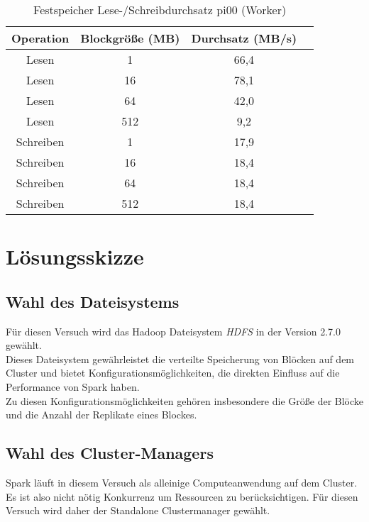 \begin{table}[ht]
	\centering %
	\begin{tabular}{c c c c} %
	\hline\hline %
	Operation & Blockgröße (MB) & Durchsatz (MB/s) \\ [0.5ex] %
	\hline %
	Lesen & 1 & 66,4 \\ 
	Lesen & 16 & 78,1 \\
	Lesen & 64 & 42,0 \\
	Lesen & 512 & 9,2 \\
	Schreiben & 1 & 17,9 \\ 
	Schreiben & 16 & 18,4 \\
	Schreiben & 64 & 18,4 \\
	Schreiben & 512 & 18,4 \\[1ex] 
	\hline %
	\end{tabular}
	\caption{Festspeicher Lese-/Schreibdurchsatz pi00 (Worker)} %
	\label{table:worker_harddrive} %
\end{table}

\section{Lösungsskizze}
\subsection{Wahl des Dateisystems}

Für diesen Versuch wird das Hadoop Dateisystem \textit{HDFS} in der Version 2.7.0 gewählt.\\

Dieses Dateisystem gewährleistet die verteilte Speicherung von Blöcken auf dem Cluster und bietet Konfigurationsmöglichkeiten, die direkten Einfluss auf die Performance von Spark haben.\\

Zu diesen Konfigurationsmöglichkeiten gehören insbesondere die Größe der Blöcke und die Anzahl der Replikate eines Blockes.\\

\subsection{Wahl des Cluster-Managers}

Spark läuft in diesem Versuch als alleinige Computeanwendung auf dem Cluster. Es ist also nicht nötig Konkurrenz um Ressourcen zu berücksichtigen. Für diesen Versuch wird daher der Standalone Clustermanager gewählt.\\

